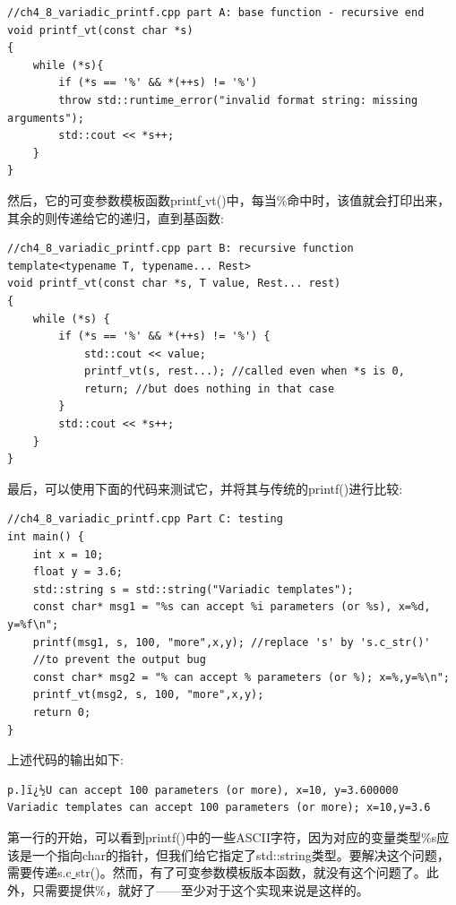 \begin{lstlisting}[caption={}]
//ch4_8_variadic_printf.cpp part A: base function - recursive end
void printf_vt(const char *s)
{
	while (*s){
		if (*s == '%' && *(++s) != '%')
		throw std::runtime_error("invalid format string: missing arguments");
		std::cout << *s++;
	}
}
\end{lstlisting}

然后，它的可变参数模板函数printf\underline{ }vt()中，每当\%命中时，该值就会打印出来，其余的则传递给它的递归，直到基函数:\par

\begin{lstlisting}[caption={}]
//ch4_8_variadic_printf.cpp part B: recursive function
template<typename T, typename... Rest>
void printf_vt(const char *s, T value, Rest... rest)
{
	while (*s) {
		if (*s == '%' && *(++s) != '%') {
			std::cout << value;
			printf_vt(s, rest...); //called even when *s is 0,
			return; //but does nothing in that case
		}
		std::cout << *s++;
	}
}
\end{lstlisting}

最后，可以使用下面的代码来测试它，并将其与传统的printf()进行比较: \par

\begin{lstlisting}[caption={}]
//ch4_8_variadic_printf.cpp Part C: testing
int main() {
	int x = 10;
	float y = 3.6;
	std::string s = std::string("Variadic templates");
	const char* msg1 = "%s can accept %i parameters (or %s), x=%d, y=%f\n";
	printf(msg1, s, 100, "more",x,y); //replace 's' by 's.c_str()'
	//to prevent the output bug
	const char* msg2 = "% can accept % parameters (or %); x=%,y=%\n";
	printf_vt(msg2, s, 100, "more",x,y);
	return 0;
}
\end{lstlisting}

上述代码的输出如下: \par

\begin{lstlisting}[caption={}]
p.]ï¿½U can accept 100 parameters (or more), x=10, y=3.600000
Variadic templates can accept 100 parameters (or more); x=10,y=3.6
\end{lstlisting}

第一行的开始，可以看到printf()中的一些ASCII字符，因为对应的变量类型\%s应该是一个指向char的指针，但我们给它指定了std::string类型。要解决这个问题，需要传递s.c\underline{ }str()。然而，有了可变参数模板版本函数，就没有这个问题了。此外，只需要提供\%，就好了——至少对于这个实现来说是这样的。 \par

